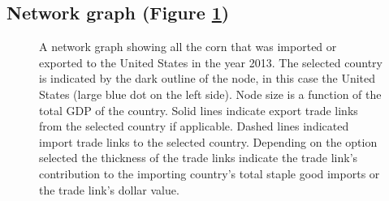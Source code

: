 		\subsection{Network graph (Figure \ref{networkGraph})}
			\begin{figure}[htb]
				\caption[NETWORK GRAPH OF 2013 CORN IMPORTS AND EXPORTS FROM THE UNITED STATES]{A network graph showing all the corn that was imported or exported to the United States in the year 2013. The selected country is indicated by the dark outline of the node, in this case the United States (large blue dot on the left side). Node size is a function of the total GDP of the country. Solid lines indicate export trade links from the selected country if applicable. Dashed lines indicated import trade links to the selected country. Depending on the option selected the thickness of the trade links indicate the trade link's contribution to the importing country's total staple good imports or the trade link's dollar value.}
				\label{networkGraph}
			\end{figure}
